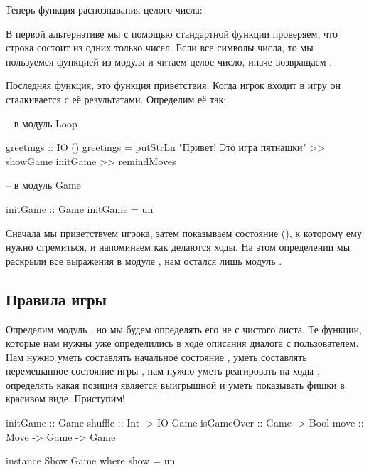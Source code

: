 Теперь функция распознавания целого числа:


В первой альтернативе мы с помощью стандартной
функции  проверяем, что 
строка состоит из одних только чисел. 
Если все символы числа, то мы пользуемся функцией из 
модуля  и читаем целое 
число, иначе возвращаем .

Последняя функция, это функция приветствия. Когда 
игрок входит в игру он сталкивается с её результатами.
Определим её так:

\begin{code}
-- в модуль Loop

greetings :: IO ()
greetings = putStrLn "Привет! Это игра пятнашки" >>
    showGame initGame >>
    remindMoves

-- в модуль Game

initGame :: Game
initGame = un
\end{code}

Сначала мы приветствуем игрока, затем показываем состояние
(), к которому ему нужно стремиться, и 
напоминаем как делаются ходы. 
На этом определении мы раскрыли все выражения в модуле ,
нам остался лишь модуль . 

\subsection{Правила игры}

Определим модуль , но мы будем определять его
не с чистого листа. Те функции, которые нам нужны уже
определились в ходе описания диалога с пользователем.
Нам нужно уметь составлять начальное состояние ,
уметь составлять перемешанное состояние игры ,
нам нужно уметь реагировать на ходы , определять
какая позиция является выигрышной  и уметь
показывать фишки в красивом виде. Приступим!

\begin{code}
initGame    :: Game
shuffle     :: Int -> IO Game
isGameOver  :: Game -> Bool
move        :: Move -> Game -> Game

instance Show Game where
    show = un
\end{code}

